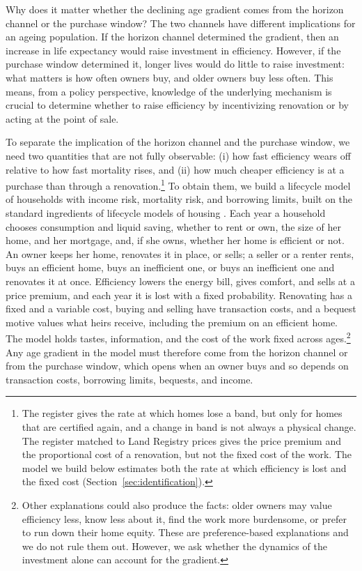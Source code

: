 Why does it matter whether the declining age gradient comes from the
horizon channel or the purchase window? The two channels have different
implications for an ageing population. If the horizon channel determined
the gradient, then an increase in life expectancy would raise investment in
efficiency. However, if the purchase window determined it, longer
lives would do little to raise investment: what matters is how often owners buy, and
older owners buy less often. This means, from a policy perspective, knowledge of the underlying mechanism is crucial to determine whether to raise efficiency by incentivizing renovation or by acting at the point of sale.



To separate the implication of the horizon channel and the purchase window, we need two quantities that are not fully observable: (i) how fast efficiency wears off relative to how fast mortality
rises, and (ii) how much cheaper efficiency is at a purchase than through a
renovation.\footnote{The register gives the rate at which homes lose a band,
but only for homes that are certified again, and a change in band is not
always a physical change. The register matched to Land Registry prices gives
the price premium and the proportional cost of a renovation, but not the fixed
cost of the work. The model we build below estimates both the rate at which
efficiency is lost and the fixed cost (Section~\ref{sec:identification}).}  To obtain them, we build a
lifecycle model of households with
income risk, mortality risk, and borrowing limits, built on the standard
ingredients of lifecycle models of housing
\citep{cocco2005portfolio,yang2009consumption,kaplan2020housing}. Each year
a household chooses consumption and liquid saving, whether to rent or own,
the size of her home, and her mortgage, and, if she owns, whether her home
is efficient or not. An owner keeps her home, renovates
it in place, or sells; a seller or a renter rents, buys an efficient home,
buys an inefficient one, or buys an inefficient one and renovates it at
once. Efficiency lowers the energy bill, gives
comfort, and sells at a price premium, and each year it is lost with a
fixed probability. Renovating has a fixed and a variable cost, buying and
selling have transaction costs, and a bequest motive values what heirs
receive, including the premium on an efficient home. The model holds
tastes, information, and the cost of the work fixed across ages.\footnote{Other explanations could also produce the facts: older owners
may value efficiency less, know less about it, find the work more
burdensome, or prefer to run down their home equity. These are preference-based explanations and we do not rule them out. However, we ask whether the dynamics of the investment alone can
account for the gradient.} Any age gradient in the model must therefore come from the horizon channel or from the purchase window, which opens when an owner buys and so depends on transaction costs, borrowing limits, bequests, and income.




